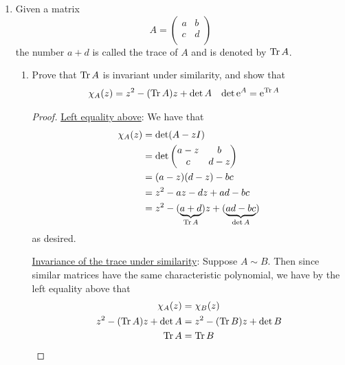 \documentclass[../psets.tex]{subfiles}
\begin{document}
\begin{enumerate}
\begin{enumerate}
\begin{proof}
\begin{center}
            \end{center}
        \end{proof}
    \end{enumerate}
    \item Given a matrix
    \begin{equation*}
        A =
        \begin{pmatrix}
            a & b\\
            c & d\\
        \end{pmatrix}
    \end{equation*}
    the number $a+d$ is called the trace of $A$ and is denoted by $\Trc A$.
    \begin{enumerate}
        \item Prove that $\Trc A$ is invariant under similarity, and show that
        \begin{align*}
            \chi_A(z) &= z^2-(\Trc A)z+\det A&
            \det\e[A] &= \e[\Trc A]
        \end{align*}
        \begin{proof}
            \underline{Left equality above}: We have that
            \begin{align*}
                \chi_A(z) &= \det(A-zI)\\
                &= \det
                \begin{pmatrix}
                    a-z & b\\
                    c & d-z\\
                \end{pmatrix}\\
                &= (a-z)(d-z)-bc\\
                &= z^2-az-dz+ad-bc\\
                &= z^2-(\underbrace{a+d}_{\Trc A})z+(\underbrace{ad-bc}_{\det A})
            \end{align*}
            as desired.\par
            \underline{Invariance of the trace under similarity}: Suppose $A\sim B$. Then since similar matrices have the same characteristic polynomial, we have by the left equality above that
            \begin{align*}
                \chi_A(z) &= \chi_B(z)\\
                z^2-(\Trc A)z+\det A &= z^2-(\Trc B)z+\det B\\
                \Trc A &= \Trc B
            \end{align*}

\end{proof}
\end{enumerate}
\end{enumerate}
\end{document}

